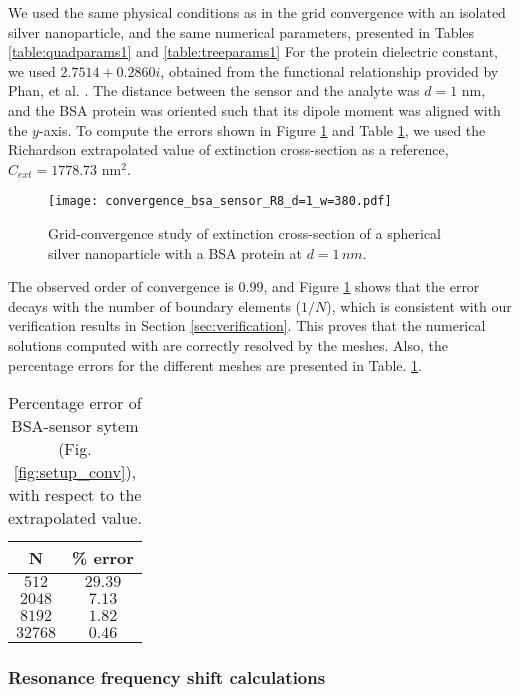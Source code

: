 We used the same physical conditions as in the grid convergence with an isolated silver nanoparticle, and the same numerical parameters, presented in Tables \ref{table:quadparams1} and \ref{table:treeparams1}
For the protein dielectric constant, we used $2.7514 + 0.2860i$, obtained from the 
functional relationship provided by Phan, et al. \cite{PhanETal2013}.
The distance between the sensor and the analyte was $d=1$ nm, 
and the BSA protein was oriented such that its dipole moment was aligned with the $y$-axis. 
To compute the errors shown in Figure \ref{fig:error_sphere-bsa} and Table \ref{table:err_bsa_sensor},
we used the Richardson extrapolated value of extinction cross-section as a reference, 
$C_{ext}= 1778.73$ nm$^2$.


\begin{figure}[h] %
   \centering
   \texttt{[image: convergence\_bsa\_sensor\_R8\_d=1\_w=380.pdf]} 
   \caption{Grid-convergence study of extinction cross-section of a spherical silver
            nanoparticle with a BSA protein at $d=1 \, nm$.}
   \label{fig:error_sphere-bsa}
\end{figure}

The observed order of convergence is $0.99$, and 
Figure \ref{fig:error_sphere-bsa} shows that the error decays with the number
of boundary elements ($1/N$), which is consistent with our verification 
results in Section \ref{sec:verification}. This proves that the
numerical solutions computed with \pygbe are correctly resolved by the meshes.
Also, the percentage errors for the different meshes are presented in Table. \ref{table:err_bsa_sensor}.

\begin{table}[h]
    \centering
    \caption{\label{table:err_bsa_sensor} Percentage error of BSA-sensor sytem (Fig.\ref{fig:setup_conv}), with respect to the extrapolated value.} 
    \begin{tabular}{c c}
    \hline%
    N & \% error \\
    \hline%
     $512$ & $29.39$ \\
     $2048$ & $7.13$ \\
     $8192$ & $1.82$ \\
     $32768$ & $0.46$ \\
    \hline%
    \end{tabular}
\end{table}

\subsubsection{Resonance frequency shift calculations} \label{sec:bsa_shift}

